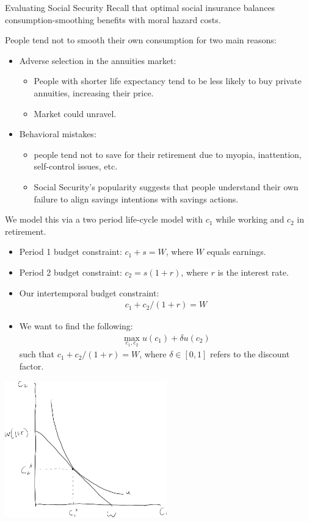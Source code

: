 \documentclass[10pt]{extarticle}
\begin{document}
  \begin{problem}{Evaluating Social Security}
    Recall that optimal social insurance balances consumption-smoothing benefits with moral hazard costs.\newline

    People tend not to smooth their own consumption for two main reasons:
    \begin{itemize}
      \item Adverse selection in the annuities market:
        \begin{itemize}
          \item People with shorter life expectancy tend to be less likely to buy private annuities, increasing their price.
          \item Market could unravel.
        \end{itemize}
      \item Behavioral mistakes:
        \begin{itemize}
          \item people tend not to save for their retirement due to myopia, inattention, self-control issues, etc.
          \item Social Security's popularity suggests that people understand their own failure to align savings intentions with savings actions.
        \end{itemize}
    \end{itemize}
    We model this via a two period life-cycle model with $c_1$ while working and $c_2$ in retirement.
    \begin{itemize}
      \item Period 1 budget constraint: $c_1 + s = W$, where $W$ equals earnings.
      \item Period 2 budget constraint: $c_2 = s(1+r)$, where $r$ is the interest rate.
      \item Our intertemporal budget constraint:
        \begin{align*}
          c_1 + c_2/(1+r) = W
        \end{align*}
      \item We want to find the following:
        \begin{align*}
          \max_{c_1,c_2}u(c_1) + \delta u(c_2)
        \end{align*}
        such that $c_1 + c_2/(1+r) = W$, where $\delta\in[0,1]$ refers to the discount factor.
    \end{itemize}
    \begin{center}
      \includegraphics[width=7cm]{images/utility_max_retirement.png}

\end{center}
\end{problem}
\end{document}
